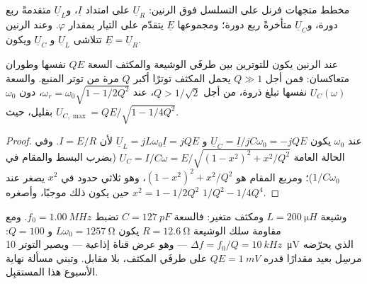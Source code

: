 \begin{omfigure}

{\small مخطط متجهات فرنل  على التسلسل فوق الرنين: $\underline U_R$
على امتداد $\underline I$، و$\underline U_L$ متقدمةً ربع دورة، و$\underline U_C$
متأخرةً ربع دورة؛ ومجموعها $\underline E$ يتقدّم على التيار بمقدار
$\varphi$. وعند الرنين تتلاشى $\underline U_L$ و $\underline U_C$ ويكون
$\underline E = \underline U_R$.}
\end{omfigure}

\begin{proposition}\label{prop:b1:sinusoidal-impedance:overvoltage}
عند الرنين يكون للتوترين بين طرفَي الوشيعة والمكثف
السعة $QE$ نفسها وطوران متعاكسان: فمن أجل $Q \gg 1$ يحمل المكثف
توترًا أكبر $Q$ مرة من توتر المنبع. والسعة
$U_C(\omega)$ نفسها تبلغ ذروة، من أجل $Q > 1/\sqrt2$، عند $\omega_r =
\omega_0\sqrt{1 - 1/2Q^2}$، دون $\omega_0$ بقليل، حيث
$U_{C,\max} = QE/\sqrt{1 - 1/4Q^2}$.
\end{proposition}

\begin{proof}
عند $\omega_0$ يكون $\underline U_C = \underline I/jC\omega_0 = -jQE$ و
$\underline U_L = jL\omega_0\underline I = jQE$ لأن $I = E/R$. وفي
الحالة العامة $U_C = I/C\omega = E/\sqrt{(1 - x^2)^2 + x^2/Q^2}$ (بضرب
البسط والمقام في $1/C\omega_0$)؛ ومربع المقام
هو $(1 - x^2)^2 + x^2/Q^2$، وهو ثلاثي حدود في $x^2$ يصغر عند $x^2 =
1 - 1/2Q^2$ حين يكون ذلك موجبًا، وأصغره $1/Q^2 - 1/4Q^4$.
\end{proof}

\begin{example}\label{ex:b1:sinusoidal-impedance:radio}
وشيعة $L = \qty{200}{\micro H}$ ومكثف متغير: فالسعة $C =
\qty{127}{pF}$ تضبط $f_0 = \qty{1.00}{MHz}$. ومع مقاومة سلك الوشيعة
$R = \qty{12.6}{\ohm}$ يكون $L\omega_0 = \qty{1257}{\ohm}$ و
$Q = 100$:  $\Delta f = f_0/Q = \qty{10}{kHz}$ --- وهو عرض
قناة إذاعية --- ويصير التوتر \qty{10}{\micro V} الذي يحرّضه مرسِل بعيد
مقدارًا قدره $QE = \qty{1}{mV}$ على طرفَي المكثف، بلا مقابل.
وتبني مسألة نهاية الأسبوع هذا المستقبِل.
\end{example}

